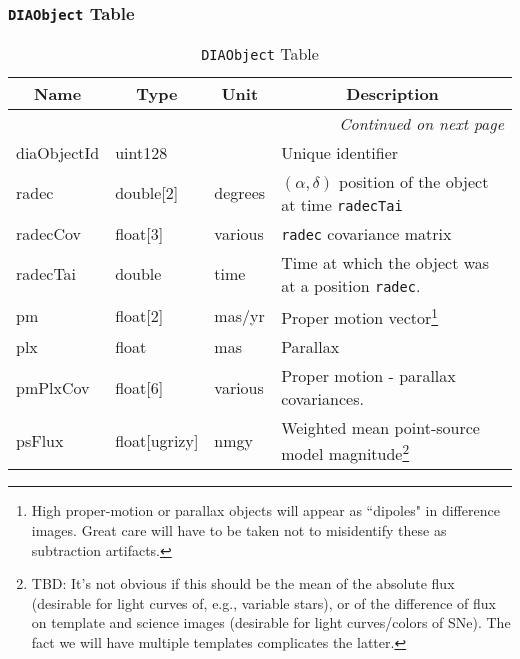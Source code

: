 \documentclass[12pt]{article}
\newcommand{\code}[1]{\texttt{#1}}
\newcommand{\DIAObject}{\code{DIAObject}\xspace}
\begin{document}
\subsubsection{\DIAObject Table}

\begin{center}
\begin{longtable}{p{3cm}p{2cm}p{2cm}p{5cm}}
\caption[\DIAObject Table]{\DIAObject Table} \\

\hline \multicolumn{1}{c}{\bf Name} & \multicolumn{1}{c}{\bf Type} & \multicolumn{1}{c}{\bf Unit} & \multicolumn{1}{c}{\bf Description} \\ \hline
\endhead

\hline \multicolumn{4}{r}{{\em Continued on next page}} \\
\endfoot

\hline\hline
\endlastfoot

diaObjectId & uint128 & ~ & Unique identifier \\ 

radec & double[2] & degrees & $(\alpha, \delta)$ position of the object at time \texttt{radecTai} \\ 

radecCov & float[3] & various & \texttt{radec} covariance matrix \\ 

radecTai & double & time & Time at which the object was at a position \texttt{radec}. \\ 

pm & float[2] & mas/yr & Proper motion vector\footnote{High proper-motion or parallax objects will appear as ``dipoles" in difference images. Great care will have to be taken not to misidentify these as subtraction artifacts.} \\ 

plx & float & mas & Parallax \\ 

pmPlxCov & float[6] & various & Proper motion - parallax covariances. \\ 

psFlux & float[ugrizy] & nmgy & Weighted mean point-source model magnitude\footnote{TBD: It's not obvious if this should be the mean of the absolute flux (desirable for light curves of, e.g., variable stars), or of the difference of flux on template and science images (desirable for light curves/colors of SNe). The fact we will have multiple templates complicates the latter.} \\ 


\end{longtable}
\end{center}
\end{document}
